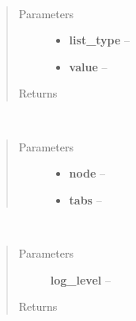 \documentclass[letterpaper,10pt,english]{sphinxmanual}
\begin{document}

\begin{fulllineitems}
\label{index:aietes.Tools.listfix}~\begin{quote}\begin{description}
\item[{Parameters}] \leavevmode\begin{itemize}
\item {} 
\textbf{list\_type} -- 

\item {} 
\textbf{value} -- 

\end{itemize}

\item[{Returns}] \leavevmode


\end{description}\end{quote}

\end{fulllineitems}


\begin{fulllineitems}
\label{index:aietes.Tools.literal_eval_walk}~\begin{quote}\begin{description}
\item[{Parameters}] \leavevmode\begin{itemize}
\item {} 
\textbf{node} -- 

\item {} 
\textbf{tabs} -- 

\end{itemize}

\end{description}\end{quote}

\end{fulllineitems}


\begin{fulllineitems}
\label{index:aietes.Tools.log_level_lookup}~\begin{quote}\begin{description}
\item[{Parameters}] \leavevmode
\textbf{log\_level} -- 

\item[{Returns}] \leavevmode


\end{description}\end{quote}

\end{fulllineitems}
\end{document}
